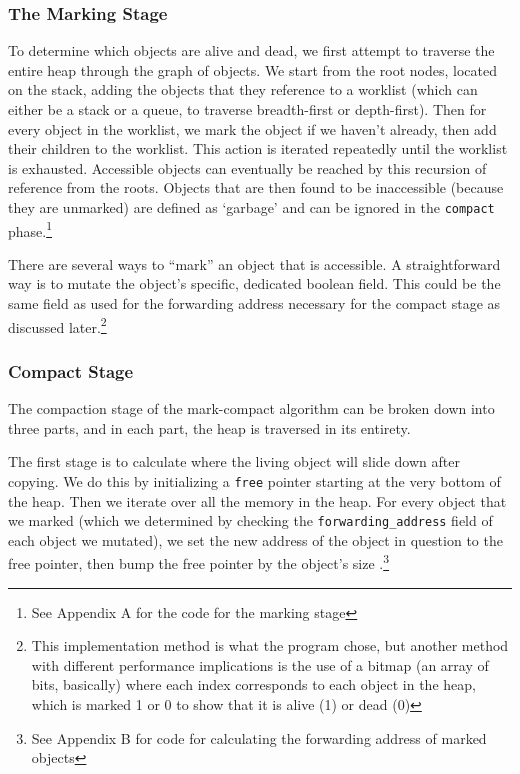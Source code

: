 \documentclass[index]{subfiles}
\begin{document}
\subsubsection{The Marking Stage}

To determine which objects are alive and dead, we first attempt to traverse the entire heap through the graph of objects. We start from the root nodes, located on the stack\cites[Ch~3~Marking]{redhat_openjdk}[Chapter~3]{gc_handbook}, adding the objects that they reference to a worklist (which can either be a stack or a queue, to traverse breadth-first or depth-first). Then for every object in the worklist, we mark the object if we haven't already, then add their children to the worklist. This action is iterated repeatedly until the worklist is exhausted. Accessible objects can eventually be reached by this recursion of reference from the roots. Objects that are then found to be inaccessible (because they are unmarked) are defined as `garbage' and can be ignored in the \verb+compact+ phase.\footnote{See Appendix A for the code for the marking stage}

There are several ways to ``mark'' an object that is accessible\cite[Chapter~3]{gc_handbook}. A straightforward way is to mutate the object's specific, dedicated boolean field. This could be the same field as used for the forwarding address necessary for the compact stage as discussed later\cite[Chapter~1]{gc_handbook}.\footnote{This implementation method is what the program chose, but another method with different performance implications is the use of a bitmap (an array of bits, basically) where each index corresponds to each object in the heap, which is marked 1 or 0 to show that it is alive (1) or dead (0)\cite[Chapter~3]{gc_handbook}}

\subsubsection{Compact Stage}

The compaction stage of the mark-compact algorithm can be broken down into three parts, and in each part, the heap is traversed in its entirety.

The first stage is to calculate where the living object will slide down after copying. We do this by initializing a \verb+free+ pointer starting at the very bottom of the heap. Then we iterate over all the memory in the heap. For every object that we marked (which we determined by checking the \verb+forwarding_address+ field of each object we mutated), we set the new address of the object in question to the free pointer, then bump the free pointer by the object's size \cites[Chapter~3]{gc_handbook}[Sections~3.3--3.5]{redhat_openjdk}.\footnote{See Appendix B for code for calculating the forwarding address of marked objects}
\end{document}
